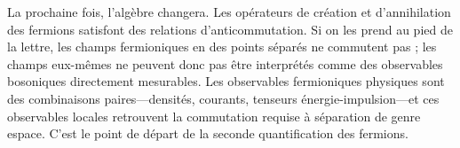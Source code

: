 La prochaine fois, l’algèbre changera. Les opérateurs de création et d’annihilation des fermions satisfont des relations d’anticommutation. Si on les prend au pied de la lettre, les champs fermioniques en des points séparés ne commutent pas ; les champs eux-mêmes ne peuvent donc pas être interprétés comme des observables bosoniques directement mesurables. Les observables fermioniques physiques sont des combinaisons paires---densités, courants, tenseurs énergie-impulsion---et ces observables locales retrouvent la commutation requise à séparation de genre espace. C’est le point de départ de la seconde quantification des fermions.
